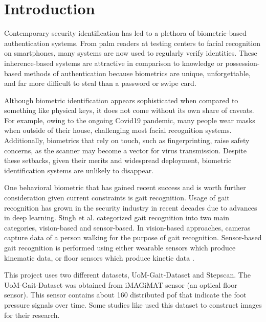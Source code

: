 \section{Introduction}

Contemporary security identification has led to a plethora of biometric-based authentication systems. From palm readers at testing centers to facial recognition on smartphones, many systems are now used to regularly verify identities. These inherence-based systems are attractive in comparison to knowledge or possession-based methods of authentication because biometrics are unique, unforgettable, and far more difficult to steal than a password or swipe card.

Although biometric identification appears sophisticated when compared to something like physical keys, it does not come without its own share of caveats. For example, owing to the ongoing Covid19 pandemic, many people wear masks when outside of their house, challenging most facial recognition systems. Additionally, biometrics that rely on touch, such as fingerprinting, raise safety concerns, as the scanner may become a vector for virus transmission. Despite these setbacks, given their merits and widespread deployment, biometric identification systems are unlikely to disappear.

One behavioral biometric that has gained recent success and is worth further consideration given current constraints is gait recognition. Usage of gait recognition has grown in the security industry in recent decades due to advances in deep learning. Singh et al. \cite{Singh2019APerspectives} categorized gait recognition into two main categories, vision-based and sensor-based. In vision-based approaches, cameras capture data of a person walking for the purpose of gait recognition. Sensor-based gait recognition is performed using either wearable sensors which produce kinematic data, or floor sensors which produce kinetic data \cite{Connor2018BiometricFeatures}.


This project uses two different datasets, UoM-Gait-Dataset and Stepscan. The UoM-Gait-Dataset was obtained from iMAGiMAT sensor \cite{Cantoral-Ceballos2015IntelligentEnvironments} (an optical floor sensor). This sensor contains about 160 distributed \gls{pof} that indicate the foot pressure signals over time. Some studies like \cite{Costilla-Reyes2020DeepHealthcare} used this dataset to construct images for their research.

